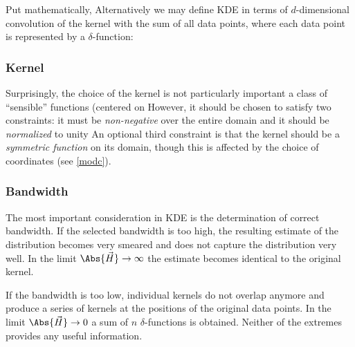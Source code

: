        Put mathematically,
        Alternatively we may define KDE in terms of $d$-dimensional convolution of the kernel with the sum of all data points,
        where each data point is represented by a $\delta$-function:

        \subsubsection{Kernel} \label{mmkk}
            Surprisingly, the choice of the kernel is not particularly important
            a class of ``sensible'' functions (centered on 
            However, it should be chosen to satisfy two constraints: it must be
            \emph{non-negative} over the entire domain
            and it should be \emph{normalized} to unity
            An optional third constraint is that the kernel should be a \emph{symmetric function} on its domain,
            though this is affected by the choice of coordinates (see \cref{modc}).

        \subsubsection{Bandwidth} \label{mmkw}
            The most important consideration in KDE is the determination of correct bandwidth.
            If the selected bandwidth is too high, the resulting estimate of the distribution
            becomes very smeared and does not capture the distribution very well.
            In the limit $\Abs{\vec{H}} \to \infty$ the estimate becomes identical to the original kernel.

            If the bandwidth is too low, individual kernels do not overlap anymore and produce a series
            of kernels at the positions of the original data points. In the limit $\Abs{\vec{H}} \to 0$
            a sum of $n$ $\delta$-functions is obtained.
            Neither of the extremes provides any useful information.

